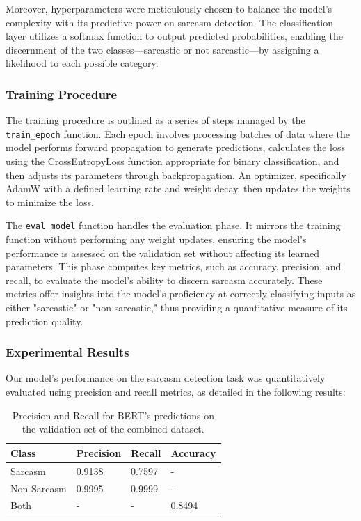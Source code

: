 \documentclass[10pt,twocolumn,letterpaper]{article}
\begin{document}
Moreover, hyperparameters were meticulously chosen to balance the model's complexity with its predictive power on sarcasm detection. The classification layer utilizes a softmax function to output predicted probabilities, enabling the discernment of the two classes—sarcastic or not sarcastic—by assigning a likelihood to each possible category.

\subsubsection{Training Procedure}
The training procedure is outlined as a series of steps managed by the \texttt{train\_epoch} function. Each epoch involves processing batches of data where the model performs forward propagation to generate predictions, calculates the loss using the CrossEntropyLoss function appropriate for binary classification, and then adjusts its parameters through backpropagation. An optimizer, specifically AdamW with a defined learning rate and weight decay, then updates the weights to minimize the loss.

The \texttt{eval\_model} function handles the evaluation phase. It mirrors the training function without performing any weight updates, ensuring the model's performance is assessed on the validation set without affecting its learned parameters. This phase computes key metrics, such as accuracy, precision, and recall, to evaluate the model's ability to discern sarcasm accurately. These metrics offer insights into the model's proficiency at correctly classifying inputs as either "sarcastic" or "non-sarcastic," thus providing a quantitative measure of its prediction quality.

\subsubsection{Experimental Results}
Our model's performance on the sarcasm detection task was quantitatively evaluated using precision and recall metrics, as detailed in the following results:

\begin{table}[H]  
    \centering  
    \begin{tabularx}{\linewidth}{|X|X|X|X|}  
        \hline  
        Class & Precision & Recall & Accuracy \\  
        \hline  
        Sarcasm & 0.9138 & 0.7597 & - \\  
        \hline  
        Non-Sarcasm & 0.9995 & 0.9999 & - \\  
        \hline  
        Both & - & - & 0.8494 \\  
        \hline  
    \end{tabularx}  
    \caption{Precision and Recall for BERT's predictions on the validation set of the combined dataset.}  
\end{table}
\end{document}
